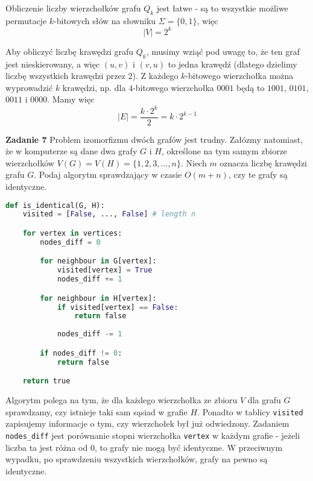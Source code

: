 \documentclass[a4paper,12pt]{article}
\newcommand{\abs}[1]{\left| #1 \right|}					%
\newcommand{\code}[1]{\lstinline[style=code]{#1}} %
\begin{document}
\noindent Obliczenie liczby wierzchołków grafu $Q_k$ jest łatwe - są to wszystkie możliwe
permutacje $k$-bitowych słów na słowniku $\Sigma = \{ 0, 1\}$, więc 
\[ 
    \abs{V} = 2^k
\]

\noindent Aby obliczyć liczbę krawędzi grafu $Q_k$, musimy wziąć pod uwagę to, że
ten graf jest nieskierowany, a więc $(u, v)$ i $(v, u)$ to jedna krawędź (dlatego
dzielimy liczbę wszystkich krawędzi przez $2$). Z każdego $k$-bitowego wierzchołka
można wyprowadzić $k$ krawędzi, np. dla $4$-bitowego wierzchołka $0001$ będą to 
$1001$, $0101$, $0011$ i $0000$. Mamy więc 
\[
    \abs{E} = \frac{k \cdot 2^k}{2} = k \cdot 2^{k-1}
\]

\noindent \newline \textbf{Zadanie 7} \newline
Problem izomorfizmu dwóch grafów jest trudny. Załózmy natomiast, że w komputerze
są dane dwa grafy $G$ i $H$, określone na tym samym zbiorze wierzchołków
$V(G) = V(H) = \{ 1, 2, 3, \ldots, n \}$. Niech $m$ oznacza liczbę krawędzi grafu
$G$. Podaj algorytm sprawdzający w czasie $O(m+n)$, czy te grafy są identyczne.

\begin{lstlisting}[style=code, language=python]
def is_identical(G, H):
    visited = [False, ..., False] # length n

    for vertex in vertices:
        nodes_diff = 0

        for neighbour in G[vertex]:
            visited[vertex] = True
            nodes_diff += 1

        for neighbour in H[vertex]:
            if visited[vertex] == False:
                return false
            
            nodes_diff -= 1

        if nodes_diff != 0:
            return false

    return true
\end{lstlisting}

\noindent Algorytm polega na tym, że dla każdego wierzchołka ze zbioru $V$ dla
grafu $G$ sprawdzamy, czy istnieje taki sam sąsiad w grafie $H$. Ponadto w tablicy
\code{visited} zapisujemy informacje o tym, czy wierzchołek był już odwiedzony.
Zadaniem \code{nodes_diff} jest porównanie stopni wierzchołka \code{vertex} 
w każdym grafie - jeżeli liczba ta jest różna od $0$, to grafy nie mogą być 
identyczne. W przeciwnym wypadku, po sprawdzeniu wszystkich wierzchołków, grafy
na pewno są identyczne.
\end{document}
